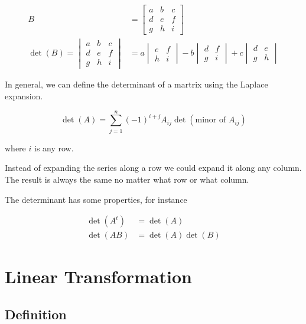 \documentclass{article}
\begin{document}
\begin{align*}
    B&=
    \begin{bmatrix}
        a & b & c \\
        d & e & f \\
        g & h & i
    \end{bmatrix}
    \\
    \det(B)=
    \begin{vmatrix}
        a & b & c \\
        d & e & f \\
        g & h & i
    \end{vmatrix}
    &=
    a \begin{vmatrix}
        e & f \\
        h & i
    \end{vmatrix}
    -b \begin{vmatrix}
        d & f \\
        g & i
    \end{vmatrix}
    +c \begin{vmatrix}
        d & e \\
        g & h
    \end{vmatrix}
\end{align*}

In general, we can define the determinant of a martrix using the Laplace expansion.

\[
    \det(A)=\sum_{j=1}^{n}{(-1)}^{i+j}A_{ij}\det(\text{minor of }A_{ij})
\]

where \(i\) is any row.

Instead of expanding the series along a row we could expand it along any column. \\
The result is always the same no matter what row or what column.

The determinant has some properties, for instance

\begin{align*}
    \det(A^t)&=\det(A) \\
    \det(AB)&=\det(A)\det(B)
\end{align*}

\pagebreak

\section{Linear Transformation}

\subsection{Definition}
\end{document}

